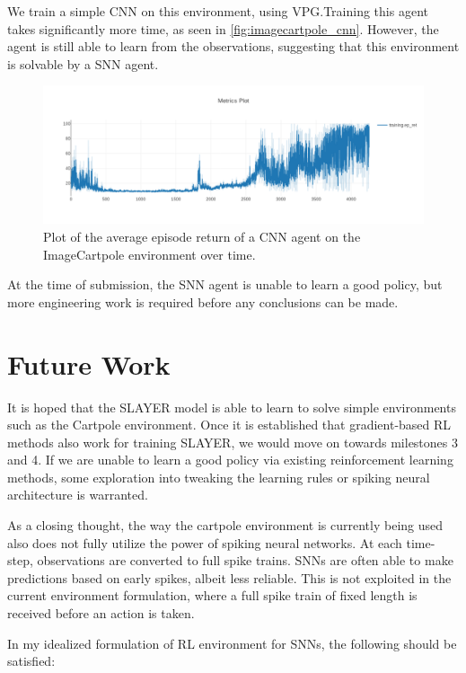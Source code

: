 \documentclass[fyp]{socreport}
\begin{document}
We train a simple CNN on this environment, using VPG.\@ Training this agent takes
significantly more time, as seen in \autoref{fig:imagecartpole_cnn}. However,
the agent is still able to learn from the observations, suggesting that this
environment is solvable by a SNN agent.

\begin{figure}[htbp] \centering
\includegraphics[width=.9\linewidth]{images/imagecartpole_cnn.png}
\caption{\label{fig:imagecartpole_cnn} Plot of the average episode return of a
CNN agent on the ImageCartpole environment over time.}
\end{figure}

At the time of submission, the SNN agent is unable to learn a good policy, but
more engineering work is required before any conclusions can be made.

\section{Future Work}

It is hoped that the SLAYER model is able to learn to solve simple environments
such as the Cartpole environment. Once it is established that gradient-based RL
methods also work for training SLAYER, we would move on towards milestones 3 and
4. If we are unable to learn a good policy via existing reinforcement learning
methods, some exploration into tweaking the learning rules or spiking neural
architecture is warranted.

As a closing thought, the way the cartpole environment is currently being used
also does not fully utilize the power of spiking neural networks. At each
time-step, observations are converted to full spike trains. SNNs are often able
to make predictions based on early spikes, albeit less reliable. This is not
exploited in the current environment formulation, where a full spike train of
fixed length is received before an action is taken.

In my idealized formulation of RL environment for SNNs, the following should be
satisfied:
\end{document}
